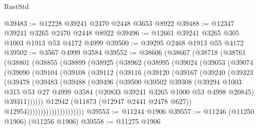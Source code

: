 \begin{lexlean}{RustStd}
\begin{coremodule}
@39483 := @12228 @39241 @2470 @2448 @3653 @8922
@39488 := @12347 @39241 @3265 @2470 @2448 @8922
@39496 := @12661 @39241 @3265 @305 @1003 @1913 @53 @4172 @4999
@39500 := @39295 @2468 @1913 @55 @4172
@39502 := @3567 @4999 @3584
@39552 := @38606
    (@38667
      (@38718
        (@38761
          (@38801
            (@38855
              (@38899
                (@38925
                  (@38962
                    (@38995
                      (@39024
                        (@39053
                          (@39074
                            (@39090
                              (@39104
                                (@39108
                                  (@39112
                                    (@39116
                                      (@39120
                                        (@39167
                                          (@39240
                                            (@39323
                                              (@39478
                                                (@39483
                                                  (@39488
                                                    (@39496
                                                      (@39500
                                                        @39502
                                                        @39308
                                                        (@39294
                                                          @1003
                                                          @315
                                                          @53
                                                          @27
                                                          @4999
                                                          @3584
                                                          (@20833
                                                            @39241
                                                            @3265
                                                            @1000
                                                            @53
                                                            @4998
                                                            @20845)
                                                          @39311))))))
                                              @12942
                                              (@11873 (@12947 @2441 @2478 @627))
                                              @12954)))))))))))))))))))))
@39553 := @11244 @1906
@39557 := @11246 (@11250 @1906) (@11256 @1906)
@39558 := @11275 @1906

\end{coremodule}
\end{lexlean}
